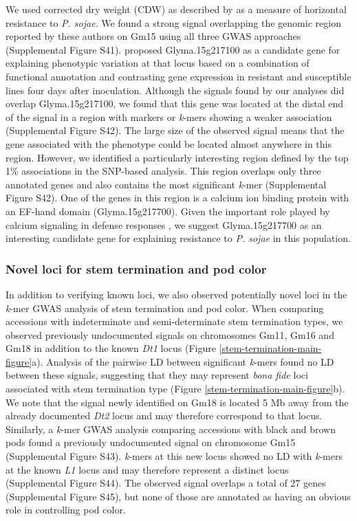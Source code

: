 \documentclass{article}
\begin{document}
We used corrected dry weight (CDW) as described by  as a
measure of horizontal resistance to \emph{P. sojae}. We found a strong signal
overlapping the genomic region reported by these authors on Gm15 using all three GWAS
approaches (Supplemental Figure S41). 
proposed Glyma.15g217100 as a candidate gene for explaining phenotypic
variation at that locus based on a combination of functional annotation and
contrasting gene expression in resistant and susceptible lines four days after
inoculation. Although the signals found by our analyses did overlap
Glyma.15g217100, we found that this gene was located at the distal end of the signal
in a region with markers or \emph{k}-mers showing a weaker
association (Supplemental Figure S42). The
large size of the observed signal means that the gene associated with the phenotype could
be located almost anywhere in this region. However, we identified a particularly
interesting region defined by the top 1\% associations in the SNP-based
analysis. This region overlaps only three annotated genes and also contains the
most significant \emph{k}-mer (Supplemental Figure
S42). One of the genes in this region is
a calcium ion binding protein with an EF-hand domain (Glyma.15g217700).
Given the important role played by calcium signaling in defense
responses , we suggest Glyma.15g217700 as an interesting
candidate gene for explaining resistance to \emph{P. sojae} in this population.

\subsubsection*{Novel loci for stem termination and pod color}

In addition to verifying known loci, we also observed potentially novel loci in
the \textit{k}-mer GWAS analysis of stem termination and pod color.  When
comparing accessions with indeterminate and semi-determinate stem termination
types, we observed previously undocumented signals on chromosomes Gm11, Gm16
and Gm18 in addition to the known \textit{Dt1} locus (Figure
\ref{stem-termination-main-figure}a).  Analysis of the pairwise LD between
significant \textit{k}-mers found no LD between these signals, suggesting that
they may represent \textit{bona fide} loci associated with stem termination
type (Figure \ref{stem-termination-main-figure}b). We note that the signal newly
identified on Gm18 is located 5 Mb away from the already documented \textit{Dt2}
locus and may therefore correspond to that locus.
Similarly, a \textit{k}-mer
GWAS analysis comparing accessions with black and brown pods found a previously
undocumented signal on chromosome Gm15 (Supplemental Figure S43).
\textit{k}-mers at this new locus
showed no LD with \textit{k}-mers at the known \textit{L1} locus and may
therefore represent a distinct locus (Supplemental Figure 
S44). The observed signal overlaps a total of 27 genes
(Supplemental Figure S45), but none of those are annotated
as having an obvious role in controlling pod color.
\end{document}
